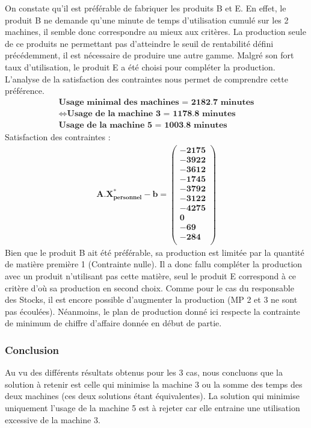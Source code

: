 \documentclass[12pt]{article}
\begin{document}
On constate qu'il est préférable de fabriquer les produits B et E. En effet, le produit B ne demande qu'une minute de temps d'utilisation cumulé sur les 2 machines, il semble donc correspondre au mieux aux critères. La production seule de ce produits ne permettant pas d'atteindre le seuil de rentabilité défini précédemment, il est nécessaire de produire une autre gamme. Malgré son fort taux d'utilisation, le produit E a été choisi pour compléter la production. L'analyse de la satisfaction des contraintes nous permet de comprendre cette préférence.
\begin{align*}
\textbf{Usage minimal des machines = 2182.7 minutes}\\
\Longleftrightarrow
\textbf{Usage de la machine 3 = 1178.8 minutes}\\
\textbf{Usage de la machine 5 = 1003.8 minutes}
\end{align*}
Satisfaction des contraintes : 
\begin{align*}
\boldsymbol{A.X^{*}_{personnel} - b = 
   \left (
   \begin{aligned}
      -2175 \\
      -3922 \\
      -3612 \\
      -1745 \\
      -3792 \\
      -3122 \\
      -4275 \\
      0 \\
      -69 \\
      -284\\
   \end{aligned}
   \right )
 } 
\end{align*}
Bien que le produit B ait été préférable, sa production est limitée par la quantité de matière première 1 (Contrainte nulle). Il a donc fallu compléter la production avec un produit n'utilisant pas cette matière, seul le produit E correspond à ce critère d'où sa production en second choix.
Comme pour le cas du responsable des Stocks, il est encore possible d'augmenter la production (MP 2 et 3 ne sont pas écoulées). Néanmoins, le plan de production donné ici respecte la contrainte de minimum de chiffre d'affaire donnée en début de partie.
\subsubsection{Conclusion}
Au vu des différents résultats obtenus pour les 3 cas, nous concluons que la solution à retenir est celle qui minimise la machine 3 ou la somme des temps des deux machines (ces deux solutions étant équivalentes).  La solution qui minimise uniquement l'usage de la machine 5 est à rejeter car elle entraine une utilisation excessive de la machine 3. 
\end{document}
